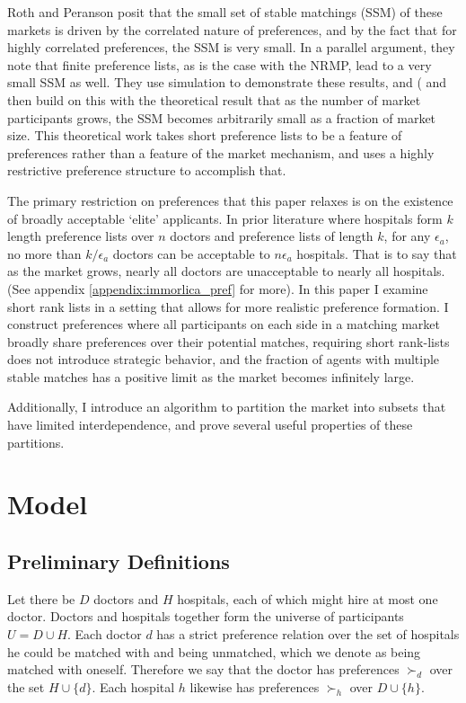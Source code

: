 \documentclass[WP]{AEA}
\begin{document}
Roth and Peranson posit that the small set of stable matchings (SSM) of these markets is driven by the correlated nature of preferences, and by the fact that for highly correlated preferences, the SSM is very small.  In a parallel argument, they note that finite preference lists, as is the case with the NRMP, lead to a very small SSM as well.  They use simulation to demonstrate these results, and (\cite{Immorlica2005} and then \cite{Kojima2009} build on this with the theoretical result that as the number of market participants grows, the SSM becomes arbitrarily small as a fraction of market size. This theoretical work takes short preference lists to be a feature of preferences rather than a feature of the market mechanism, and uses a highly restrictive preference structure to accomplish that. 

The primary restriction on preferences that this paper relaxes is on the existence of broadly acceptable `elite' applicants. In prior literature where hospitals form $k$ length preference lists over $n$ doctors and preference lists of length $k$,  for any $\epsilon_a$, no more than $k/\epsilon_a$ doctors can be acceptable to $n\epsilon_a$ hospitals. That is to say that as the market grows, nearly all doctors are unacceptable to nearly all hospitals. (See appendix \ref{appendix:immorlica_pref} for more).  
In this paper I examine short rank lists in a setting that allows for more realistic preference formation. I construct preferences where all participants on each side in a matching market broadly share preferences over their potential matches, requiring short rank-lists does not introduce strategic behavior, and the fraction of agents with multiple stable matches has a positive limit as the market becomes infinitely large.

Additionally, I introduce an algorithm to partition the market into subsets that have limited interdependence, and prove several useful properties of these partitions.

\section{Model}
\subsection{Preliminary Definitions}

Let there be $D$ doctors and $H$ hospitals, each of which might hire at most one doctor. Doctors and hospitals together form the universe of participants $U = D \cup H$.  Each doctor $d$ has a strict preference relation over the set of hospitals he could be matched with and being unmatched, which we denote as being matched with oneself. Therefore we say that the doctor has preferences $\succ_{d}$ over the set $H \cup \{d\}$. Each hospital $h$ likewise has preferences $\succ_h$ over $D \cup \{h\}$. 
\end{document}
